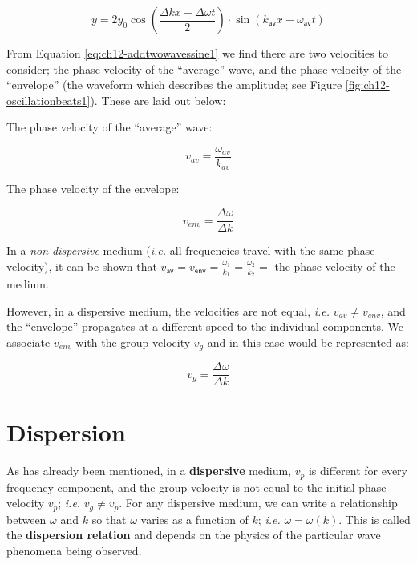 \documentclass[
]{book}
\begin{document}
\begin{equation}
y= 2 y_{0} \cos \left (\frac{\Delta kx - \Delta\omega t}{2}\right) \cdot \sin(k_\textsf{av}x - \omega_\textsf{av}t )
\label{eq:ch12-addtwowavessine1}
\end{equation}

From Equation \eqref{eq:ch12-addtwowavessine1} we find there are two velocities to consider; the phase velocity of the ``average'' wave, and the phase velocity of the ``envelope'' (the waveform which describes the amplitude; see Figure \ref{fig:ch12-oscillationbeats1}). These are laid out below:

The phase velocity of the ``average'' wave:

\begin{equation}
v_{av} = \frac{\omega_{av}}{k_{av}}
\end{equation}

The phase velocity of the envelope:

\begin{equation}
v_{env} = \frac{\Delta\omega}{\Delta k}
\end{equation}

In a \emph{non-dispersive} medium (\emph{i.e.} all frequencies travel with the same phase velocity), it can be shown that \(v_{\textsf{av}} = v_{\textsf{env}} = \frac{\omega_1}{k_1} = \frac{\omega_2}{k_2} =\) the phase velocity of the medium.

However, in a dispersive medium, the velocities are not equal, \emph{i.e.} \(v_{av} \neq v_{env}\), and the ``envelope'' propagates at a different speed to the individual components. We associate \(v_{env}\) with the group velocity \(v_g\) and in this case would be represented as:

\begin{equation}
v_{g} = \frac{\Delta\omega}{\Delta k}
\end{equation}

\hypertarget{sec-ch12-dispersion}{%
\section{Dispersion}\label{sec-ch12-dispersion}}

As has already been mentioned, in a \textbf{dispersive} medium, \(v_p\) is different for every frequency component, and the group velocity is not equal to the initial phase velocity \(v_p\); \emph{i.e.} \(v_g \neq v_p\). For any dispersive medium, we can write a relationship between \(\omega\) and \(k\) so that \(\omega\) varies as a function of \(k\); \emph{i.e.} \(\omega = \omega(k)\). This is called the \textbf{dispersion relation} and depends on the physics of the particular wave phenomena being observed.
\end{document}
